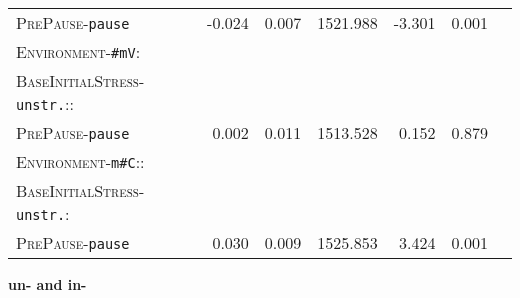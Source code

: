 \begin{table}[H]
\begin{center}
{\begin{tabular} {lrrrrrr}
		\textsc{PrePause}-\texttt{pause} & -0.024 & 0.007 & 1521.988 & -3.301 & 0.001 \\ 
		\textsc{Environment}-\texttt{\#mV}:&&&&&\\
		\textsc{BaseInitialStress}-\texttt{unstr.}::&&&&&\\
		\textsc{PrePause}-\texttt{pause} & \color[HTML]{9B9B9B}0.002 & \color[HTML]{9B9B9B}0.011 & \color[HTML]{9B9B9B}1513.528 & \color[HTML]{9B9B9B}0.152 &\color[HTML]{9B9B9B}0.879 \\ 
		\textsc{Environment}-\texttt{m\#C}::&&&&&\\
		\textsc{BaseInitialStress}-\texttt{unstr.}:&&&&&\\
		\textsc{PrePause}-\texttt{pause }& 0.030 & 0.009 & 1525.853 & 3.424 & 0.001 \\ 
		\hline		
		
			\end{tabular}
}
\end{center}

\end{table}
\clearpage

\textbf{un- and in-}



